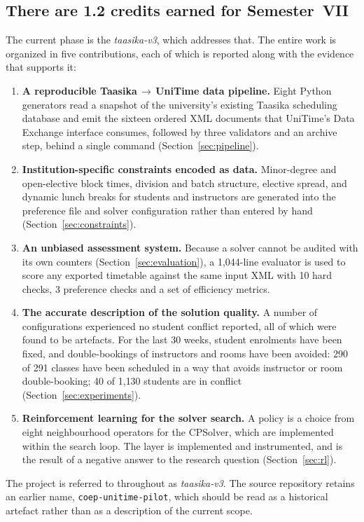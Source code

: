 \subsection{There are 1.2 credits earned for Semester~VII}

The current phase is the \emph{taasika-v3}, which addresses that. The entire work is organized in five contributions, each of which is reported along with the evidence that supports it:

\begin{enumerate}
  \item \textbf{A reproducible Taasika\,$\rightarrow$\,UniTime data pipeline.} Eight Python
    generators read a snapshot of the university's existing Taasika scheduling database and emit
    the sixteen ordered XML documents that UniTime's Data Exchange interface consumes, followed by
    three validators and an archive step, behind a single command
    (Section~\ref{sec:pipeline}).
  \item \textbf{Institution-specific constraints encoded as data.} Minor-degree and open-elective
    block times, division and batch structure, elective spread, and dynamic lunch breaks for
    students and instructors are generated into the preference file and solver configuration rather
    than entered by hand (Section~\ref{sec:constraints}).
  \item \textbf{An unbiased assessment system.} Because a solver cannot be audited with its own
    counters (Section~\ref{sec:evaluation}), a 1{,}044-line evaluator is used to score any exported
    timetable against the same input XML with 10 hard checks, 3 preference checks and a set of
    efficiency metrics.
  \item \textbf{The accurate description of the solution quality.} A number of configurations
    experienced no student conflict reported, all of which were found to be artefacts. For the last
    30 weeks, student enrolments have been fixed, and double-bookings of instructors and rooms have
    been avoided: 290 of 291 classes have been scheduled in a way that avoids instructor or room
    double-booking; 40 of 1{,}130 students are in conflict (Section~\ref{sec:experiments}).
  \item \textbf{Reinforcement learning for the solver search.} A policy is a choice from eight
    neighbourhood operators for the CPSolver, which are implemented within the search loop. The
    layer is implemented and instrumented, and is the result of a negative answer to the research
    question (Section~\ref{sec:rl}).
\end{enumerate}

The project is referred to throughout as \emph{taasika-v3}. The source repository retains an earlier
name, \texttt{coep-unitime-pilot}, which should be read as a historical artefact rather than as a
description of the current scope.
